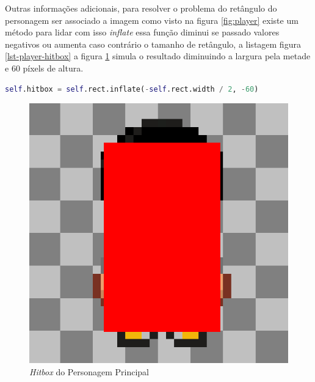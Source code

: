 

\clearpage

Outras informações adicionais, 
para resolver o problema do retângulo do personagem ser associado a imagem como visto na figura \ref{fig:player} existe um método para lidar com isso \textit{inflate} essa função diminui se passado valores negativos ou aumenta caso contrário o tamanho de retângulo, a listagem figura \ref{lst-player-hitbox} a figura \ref{fig:player-hitbox} simula o resultado diminuindo a largura pela metade e 60 píxels de altura.

\begin{lstlisting}[language=Python,breaklines, caption= Uso da Função Inflate, label= lst-player-hitbox]
self.hitbox = self.rect.inflate(-self.rect.width / 2, -60)
\end{lstlisting}
\begin{figure}[h!]
    \centering
    \includegraphics[width=0.5\linewidth]{figuras/player-hitbox.png}
    \caption{\textit{Hitbox} do Personagem Principal}
    \label{fig:player-hitbox}
\end{figure}



